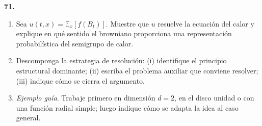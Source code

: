 \documentclass[11pt, letterpaper]{article}
\begin{document}
\newpage

\begin{ejercicio}
    \textbf{71.} 
    \begin{enumerate}
        \item Sea $u(t,x) = \mathbb{E}_x[f(B_t)]$. Muestre que $u$ resuelve la ecuación del calor y explique en qué sentido el browniano proporciona una representación probabilística del semigrupo de calor.
        \item Descomponga la estrategia de resolución: (i) identifique el principio estructural dominante; (ii) escriba el problema auxiliar que conviene resolver; (iii) indique cómo se cierra el argumento.
        \item \textit{Ejemplo guía}. Trabaje primero en dimensión $d=2$, en el disco unidad o con una función radial simple; luego indique cómo se adapta la idea al caso general.
    \end{enumerate}
\end{ejercicio}

\vspace{5mm}
\end{document}
